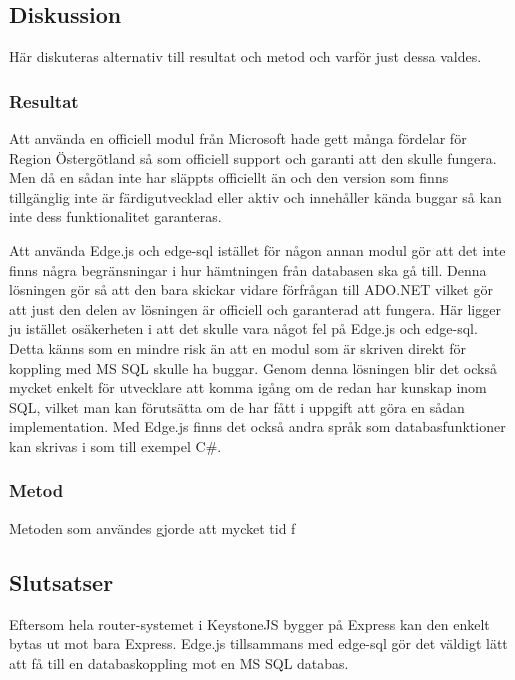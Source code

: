 \subsection{Diskussion}
Här diskuteras alternativ till resultat och metod och varför just dessa valdes.
\subsubsection{Resultat}
Att använda en officiell modul från Microsoft hade gett många fördelar för Region Östergötland så som officiell support och garanti att den skulle fungera. Men då en sådan inte har släppts officiellt än och den version som finns tillgänglig inte är färdigutvecklad eller aktiv \cite{sqlGit} och innehåller kända buggar \cite{sqlBugs} så kan inte dess funktionalitet garanteras. 

Att använda Edge.js och edge-sql istället för någon annan modul gör att det inte finns några begränsningar i hur hämtningen från databasen ska gå till. Denna lösningen gör så att den bara skickar vidare förfrågan till ADO.NET vilket gör att just den delen av lösningen är officiell och garanterad att fungera. Här ligger ju istället osäkerheten i att det skulle vara något fel på Edge.js och edge-sql. Detta känns som en mindre risk än att en modul som är skriven direkt för koppling med MS SQL skulle ha buggar.
Genom denna lösningen blir det också mycket enkelt för utvecklare att komma igång om de redan har kunskap inom SQL, vilket man kan förutsätta om de har fått i uppgift att göra en sådan implementation. Med Edge.js finns det också andra språk som databasfunktioner kan skrivas i som till exempel C\#. 

\subsubsection{Metod}
Metoden som användes gjorde att mycket tid f

\subsection{Slutsatser}
Eftersom hela router-systemet i KeystoneJS bygger på Express kan den enkelt bytas ut mot bara Express. Edge.js tillsammans med edge-sql gör det väldigt lätt att få till en databaskoppling mot en MS SQL databas.
